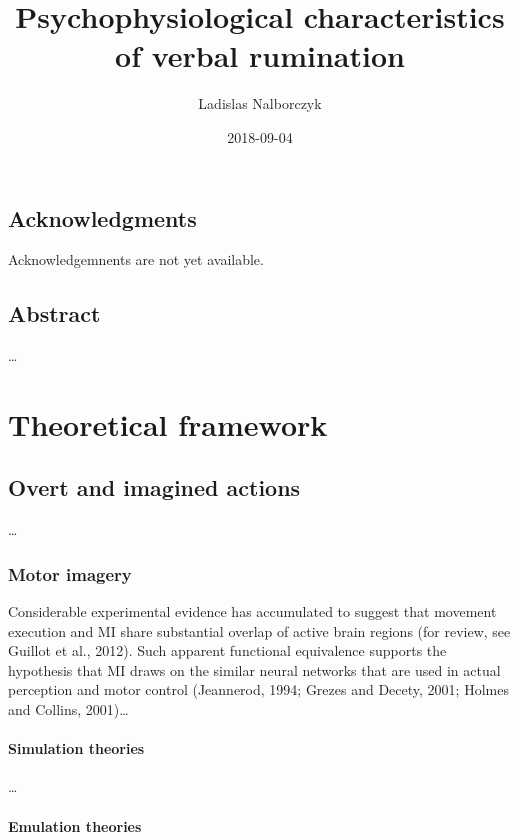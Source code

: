 \documentclass[12pt,]{book}
\title{Psychophysiological characteristics of verbal rumination}
\author{Ladislas Nalborczyk}
\date{2018-09-04}
\begin{document}
\maketitle

{
\setcounter{tocdepth}{3}
\tableofcontents
}
\listoftables
\listoffigures
\chapter*{Acknowledgments}\label{acknowledgments}

Acknowledgemnents are not yet available.

\chapter*{Abstract}\label{abstract}

\ldots{}

\part{Theoretical
framework}\label{part-theoretical-framework}

\chapter{Overt and imagined actions}\label{intro}

\ldots{}

\section{Motor imagery}\label{motor-imagery}

Considerable experimental evidence has accumulated to suggest that
movement execution and MI share substantial overlap of active brain
regions (for review, see Guillot et al., 2012). Such apparent functional
equivalence supports the hypothesis that MI draws on the similar neural
networks that are used in actual perception and motor control
(Jeannerod, 1994; Grezes and Decety, 2001; Holmes and Collins,
2001)\ldots{}

\subsection{Simulation theories}\label{simulation-theories}

\ldots{}

\subsection{Emulation theories}\label{emulation-theories}
\end{document}
